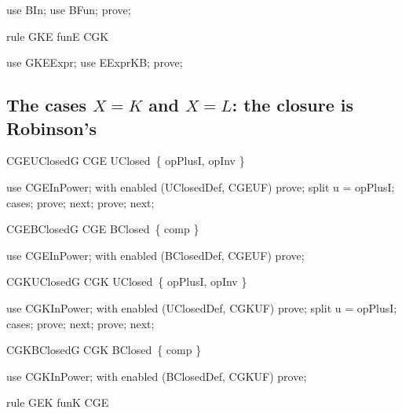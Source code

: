 \documentclass{article}
\begin{document}
\begin{zproof}
use BIn;
use BFun;
prove;
\end{zproof}

\begin{theorem}{rule GKE}
  funE \in CGK
\end{theorem}

\begin{zproof}
use GKEExpr;
use EExprKB;
prove;
\end{zproof}

\subsection{The cases $X = K$ and $X = L$: the closure is Robinson's}

\begin{theorem}{CGEUClosedG}
  CGE \in UClosed~\{ opPlusI, opInv \}
\end{theorem}

\begin{zproof}
use CGEInPower;
with enabled (UClosedDef, CGEUF) prove;
split u = opPlusI;
cases;
prove;
next;
prove;
next;
\end{zproof}

\begin{theorem}{CGEBClosedG}
  CGE \in BClosed~\{ comp \}
\end{theorem}

\begin{zproof}
use CGEInPower;
with enabled (BClosedDef, CGEUF) prove;
\end{zproof}

\begin{theorem}{CGKUClosedG}
  CGK \in UClosed~\{ opPlusI, opInv \}
\end{theorem}

\begin{zproof}
use CGKInPower;
with enabled (UClosedDef, CGKUF) prove;
split u = opPlusI;
cases;
prove;
next;
prove;
next;
\end{zproof}

\begin{theorem}{CGKBClosedG}
  CGK \in BClosed~\{ comp \}
\end{theorem}

\begin{zproof}
use CGKInPower;
with enabled (BClosedDef, CGKUF) prove;
\end{zproof}


\begin{theorem}{rule GEK}
  funK \in CGE
\end{theorem}
\end{document}
